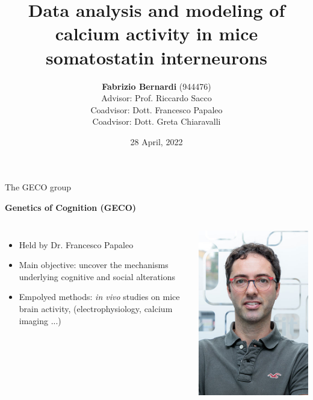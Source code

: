 \documentclass{beamer}
\title{Data analysis and modeling of  calcium activity in   mice somatostatin interneurons}
\author[F. Bernardi]{\textbf{Fabrizio Bernardi} (944476) \\
	Advisor: Prof. Riccardo Sacco \\
	Coadvisor: Dott. Francesco Papaleo \\
	Coadvisor: Dott. Greta Chiaravalli} \medskip
\date[28/04/2022]{28 April, 2022}
\begin{document}
	
	
	\begin{frame}
	\titlepage



\end{frame}

	\begin{frame}{The GECO group}



\textbf{Genetics of Cognition (GECO)}


\begin{columns}
	\begin{itemize}
		\vspace{0.5cm}
		\item Held by Dr. Francesco Papaleo
		
		\vspace{0.5cm}
		
		\item Main objective: uncover the mechanisms underlying cognitive and social alterations
		
		\vspace{0.5cm}
		
		\item Empolyed methods: \textit{in vivo} studies on mice brain activity, (electrophysiology, calcium imaging ...)
		
	\end{itemize}
	\centering
	\includegraphics[scale=0.25]{papaleo}
	
\end{columns}



\end{frame}
\end{document}
